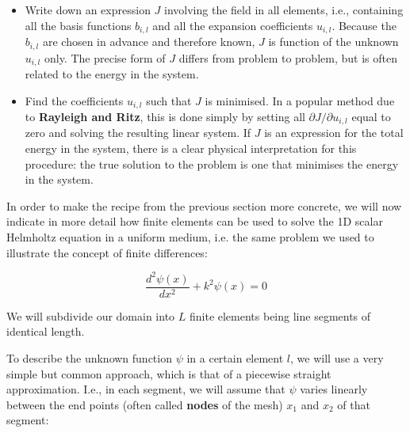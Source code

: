 \begin{itemize}
\item
Write down an expression $J$ involving the field in all elements, i.e., containing all the basis functions $b_{i,l}$ and all the expansion coefficients $u_{i,l}$. Because the  $b_{i,l}$ are chosen in advance and therefore known, $J$ is function of the unknown $u_{i,l}$ only. The precise form of $J$ differs from problem to problem, but is often related to the energy in the system.

\item
Find the coefficients $u_{i,l}$ such that $J$ is minimised. In a popular method due to \textbf{Rayleigh and Ritz}, this is done simply by setting all $\partial J / \partial u_{i,l}$ equal to zero and solving the resulting linear system. If $J$ is an expression for the total energy in the system, there is a clear physical interpretation for this procedure: the true solution to the problem is one that minimises the energy in the system.
\end{itemize}


\pagebreak




In order to make the recipe from the previous section more concrete, we will now indicate in more detail how finite elements can be used to solve the 1D scalar Helmholtz equation in a uniform medium, i.e. the same problem we used to illustrate the concept of finite differences:

\begin{equation}
\frac{d^2 \psi (x)}{d x^2} + k^2 \psi(x) = 0 \label{eq-helmholtz-1d-2}
\end{equation} 

We will subdivide our domain into $L$ finite elements being line segments of identical length.


To describe the unknown function $\psi$ in a certain element $l$, we will use a very simple but common approach, which is that of a piecewise straight approximation.  I.e., in each segment, we will assume that $\psi$ varies linearly between the end points (often called \textbf{nodes} of the mesh) $x_1$ and $x_2$ of that segment:

\noindent{}

